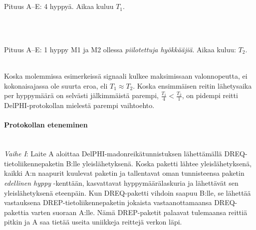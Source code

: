 \documentclass[finnish]{tktltiki2}
\theoremstyle{definition}
\theoremstyle{remark}
\begin{document}
\noindent\\

\noindent\\
Pituus A--E: 4 hyppyä. Aikaa kuluu $T_1$.

\noindent\\

\noindent \\
Pituus A--E: 1 hyppy M1 ja M2 ollessa \emph{piilotettuja hyökkääjiä}. Aikaa kuluu: $T_2$.

\noindent \\
Koska molemmissa esimerkeissä signaali kulkee maksimissaan valonnopeutta, ei kokonaisajassa ole suurta eroa, eli $T_1 \approx T_2$. Koska ensimmäisen reitin lähetysaika per hyppymäärä on selvästi jälkimmäistä parempi, $\frac{T_1}{4} < \frac{T_2}{1}$, on pidempi reitti DelPHI-protokollan mielestä parempi vaihtoehto.

\paragraph{Protokollan eteneminen}
\noindent \\
\emph{Vaihe I}: Laite A aloittaa DelPHI-madonreikätunnistuksen lähettämällä DREQ-tietoliikennepaketin B:lle yleislähetyksenä. Koska paketti lähtee yleislähetyksenä, kaikki A:n naapurit kuulevat paketin ja tallentavat oman tunnisteensa paketin \emph{edellinen hyppy} -kenttään, kasvattavat hyppymäärälaskuria ja lähettävät sen yleislähetyksenä eteenpäin. Kun DREQ-paketti vihdoin saapuu B:lle, se lähettää vastauksena DREP-tietoliikennepaketin jokaista vastaanottamaansa DREQ-pakettia varten suoraan A:lle. Nämä DREP-paketit palaavat tulemaansa reittiä pitkin ja A saa tietää useita uniikkeja reittejä verkon läpi.
\end{document}
